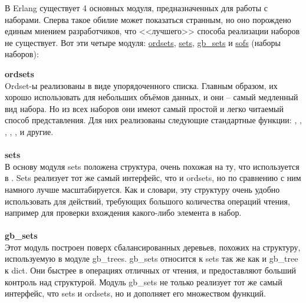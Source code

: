 В Erlang существует 4 основных модуля, предназначенных для работы с наборами.
Сперва такое обилие может показаться странным, но оно порождено единым мнением разработчиков, что <<лучшего>> способа реализации наборов не существует.
Вот эти четыре модуля: \href{http://erldocs.com/R15B/stdlib/ordets.html}{ordsets}, \href{http://erldocs.com/R15B/stdlib/sets.html}{sets}, \href{http://erldocs.com/R15B/stdlib/gb\_sets.html}{gb\_sets} и \href{http://erldocs.com/R15B/stdlib/sofs.html}{sofs} (наборы наборов):

\begin{minipage}{1.0\linewidth}
    \textbf{ordsets}\\
    Ordset\--ы реализованы в виде упорядоченного списка.
    Главным образом, их хорошо использовать для небольших объёмов данных, и они \--- самый медленный вид набора.
    Но из всех наборов они имеют самый простой и легко читаемый способ представления.
    Для них реализованы следующие стандартные функции: , , , , ,  и другие.\\
    \\
    \textbf{sets}\\
    В основу модуля sets положена структура, очень похожая на ту, что используется в .
    Sets реализует тот же самый интерфейс, что и ordsets, но по сравнению с ним намного лучше масштабируется.
    Как и словари, эту структуру очень удобно использовать для действий, требующих большого количества операций чтения, например для проверки вхождения какого\--либо элемента в набор.\\
    \\
    \textbf{gb\_sets}\\
    Этот модуль построен поверх сбалансированных деревьев, похожих на структуру, используемую в модуле gb\_trees.
    gb\_sets относится к sets так же как и gb\_tree к dict.
    Они быстрее в операциях отличных от чтения, и предоставляют больший контроль над структурой.
    Модуль gb\_sets не только реализует тот же самый интерфейс, что sets и ordsets, но и дополняет его множеством функций.

\end{minipage}

